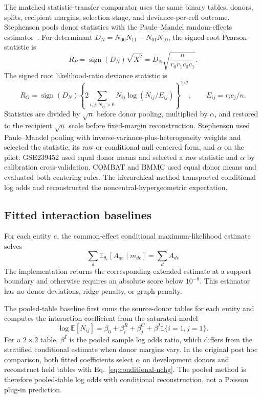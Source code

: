 \documentclass[10pt,a4paper]{article}
\begin{document}
The matched statistic-transfer comparator uses the same binary tables, donors, splits, recipient margins, selection stage, and deviance-per-cell outcome. Stephenson pools donor statistics with the Paule--Mandel random-effects estimator~\cite{paule1982}. For determinant $D_N=N_{00}N_{11}-N_{01}N_{10}$, the signed root Pearson statistic is
\begin{equation}
 R_P=\operatorname{sign}(D_N)\sqrt{X^2}
 =D_N\sqrt{\frac{n}{r_0r_1c_0c_1}}.
\end{equation}
The signed root likelihood-ratio deviance statistic is
\begin{equation}
 R_G=\operatorname{sign}(D_N)
 \left\{2\sum_{i,j:N_{ij}>0}N_{ij}\log(N_{ij}/E_{ij})\right\}^{1/2},
 \qquad E_{ij}=r_ic_j/n.
\end{equation}
Statistics are divided by $\sqrt n$ before donor pooling, multiplied by $\alpha$, and restored to the recipient $\sqrt n$ scale before fixed-margin reconstruction. Stephenson used Paule--Mandel pooling with inverse-variance-plus-heterogeneity weights and selected the statistic, its raw or conditional-null-centered form, and $\alpha$ on the pilot. GSE239452 used equal donor means and selected a raw statistic and $\alpha$ by calibration cross-validation. COMBAT and BMMC used equal donor means and evaluated both centering rules. The hierarchical method transported conditional log odds and reconstructed the noncentral-hypergeometric expectation.

\subsection{Fitted interaction baselines}

For each entity $e$, the common-effect conditional maximum-likelihood estimate solves
\[
  \sum_d \mathbb E_{\theta_e}[A_{de}\mid m_{de}]
  =\sum_d A_{de}
\]
The implementation returns the corresponding extended estimate at a support boundary and otherwise requires an absolute score below $10^{-8}$. This estimator has no donor deviations, ridge penalty, or graph penalty.

The pooled-table baseline first sums the source-donor tables for each entity and computes the interaction coefficient from the saturated model
\[
  \log \mathbb E[N_{ij}]=\beta_0+\beta_i^{R}+\beta_j^{C}
  +\beta^{I}\mathbb 1\{i=1,j=1\}.
\]
For a $2\times2$ table, $\beta^{I}$ is the pooled sample log odds ratio, which differs from the stratified conditional estimate when donor margins vary. In the original post hoc comparison, both fitted coefficients select $\alpha$ on development donors and reconstruct held tables with Eq.~\eqref{eq:conditional-nchg}. The pooled method is therefore pooled-table log odds with conditional reconstruction, not a Poisson plug-in prediction.
\end{document}

